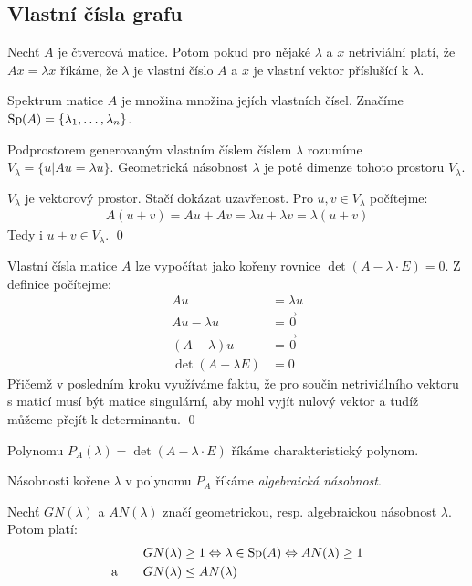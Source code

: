 \subsection{Vlastní čísla grafu}


\df Nechť $A$ je čtvercová matice. Potom pokud pro nějaké $\lambda$ a $x$ netriviální platí, že $Ax=\lambda x$ říkáme, že $\lambda$ je vlastní číslo $A$ a $x$ je vlastní vektor příslušící k $\lambda$.

\df Spektrum matice $A$ je množina množina jejích vlastních čísel. Značíme $\operatorname{Sp}(A) = \{ \lambda_1, \ldots, \lambda_n \}$.

\df Podprostorem generovaným vlastním číslem číslem $\lambda$ rozumíme $V_\lambda = \{u | Au = \lambda u \}$. Geometrická násobnost $\lambda$ je poté dimenze tohoto prostoru $V_\lambda$.

\tv $V_\lambda$ je vektorový prostor.
\dk Stačí dokázat uzavřenost. Pro $u,v\in V_\lambda$ počítejme:
\begin{align}
	A(u+v) = Au + Av = \lambda u + \lambda v = \lambda(u+v)
\end{align}
Tedy i $u+v\in V_\lambda$. \qed

\tv Vlastní čísla matice $A$ lze vypočítat jako kořeny rovnice $\det(A - \lambda \cdot E) = 0$.
\dk Z definice počítejme:
\begin{align}
	Au &= \lambda u \\
	Au - \lambda u &= \vec0 \\
	(A-\lambda) u &= \vec0 \\
	\det(A - \lambda E) &= 0 
\end{align}
Přičemž v posledním kroku využíváme faktu, že pro součin netriviálního vektoru s maticí musí být matice singulární, aby mohl vyjít nulový vektor a tudíž můžeme přejít k determinantu. \qed

\df Polynomu $P_A(\lambda) = \det(A - \lambda \cdot E)$ říkáme charakteristický polynom.

\df Násobnosti kořene $\lambda$ v polynomu $P_A$ říkáme {\it algebraická násobnost}.

\vt Nechť $GN(\lambda)$ a $AN(\lambda)$ značí geometrickou, resp. algebraickou násobnost $\lambda$. Potom platí:
\begin{align}
&GN(\lambda) \geq 1 \Leftrightarrow \lambda \in \operatorname{Sp}(A) \Leftrightarrow AN(\lambda) \geq 1\\
\text{a}\qquad &GN(\lambda) \leq AN(\lambda)
\end{align}

